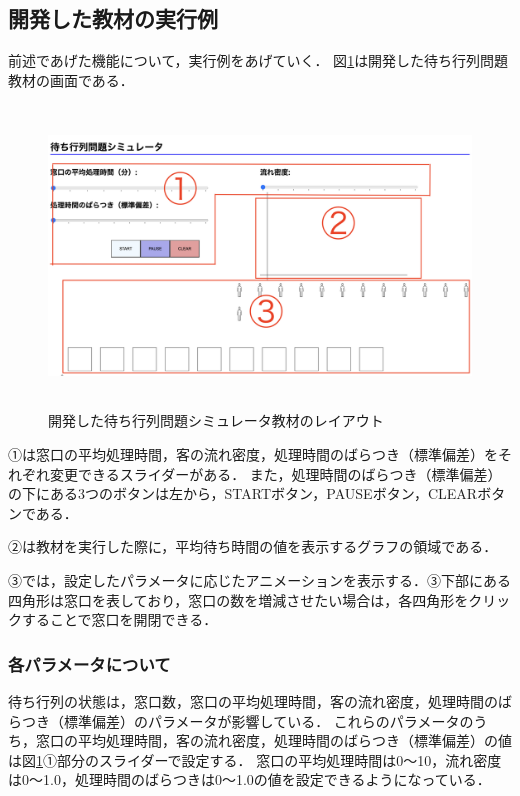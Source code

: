 \documentclass[12pt,a4j]{ltjsarticle}
\begin{document}
\subsection{開発した教材の実行例}
前述であげた機能について，実行例をあげていく．
図\ref{fig:layout_ex}は開発した待ち行列問題教材の画面である．
\begin{figure}[h]
\begin{center}
\includegraphics[height = 80mm ] {figures/layout_ex.pdf}
\caption{開発した待ち行列問題シミュレータ教材のレイアウト}
\label{fig:layout_ex}
\end{center}
\end{figure}

①は窓口の平均処理時間，客の流れ密度，処理時間のばらつき（標準偏差）をそれぞれ変更できるスライダーがある．
また，処理時間のばらつき（標準偏差）の下にある3つのボタンは左から，STARTボタン，PAUSEボタン，CLEARボタンである．

②は教材を実行した際に，平均待ち時間の値を表示するグラフの領域である．

③では，設定したパラメータに応じたアニメーションを表示する．③下部にある四角形は窓口を表しており，窓口の数を増減させたい場合は，各四角形をクリックすることで窓口を開閉できる．

\clearpage

\subsubsection{各パラメータについて}
待ち行列の状態は，窓口数，窓口の平均処理時間，客の流れ密度，処理時間のばらつき（標準偏差）のパラメータが影響している．
これらのパラメータのうち，窓口の平均処理時間，客の流れ密度，処理時間のばらつき（標準偏差）の値は図\ref{fig:layout_ex}①部分のスライダーで設定する．
窓口の平均処理時間は0〜10，流れ密度は0〜1.0，処理時間のばらつきは0〜1.0の値を設定できるようになっている．
\end{document}
